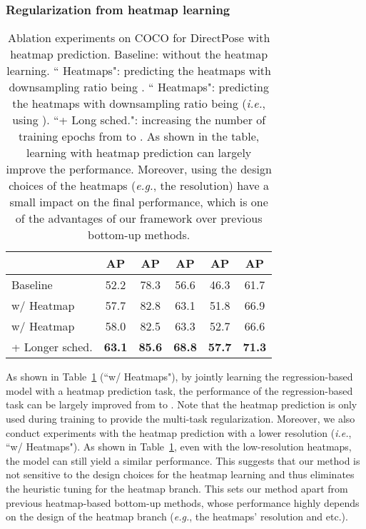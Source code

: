 \documentclass[10pt,twocolumn,letterpaper]{article}
\renewcommand{\texttt}[1]{}
\def\eg{{\it e.g.}\xspace}
\def\ie{{\it i.e.}\xspace}
\newcommand{\1}{{\mathbbm{1}}}
\begin{document}
{\subsubsection{Regularization from heatmap learning}
\begin{table}
	\small
    \begin{center}
	\begin{tabular}{ l | c c c c c}
		\hline
		& AP & AP & AP & AP & AP \\
		\hline\hline
		Baseline & 52.2 & 78.3 & 56.6 & 46.3 & 61.7 \\
		w/  Heatmap & 57.7 & 82.8 & 63.1 & 51.8 & 66.9 \\
		w/ \space\space Heatmap & 58.0 & 82.5 & 63.3 & 52.7 & 66.6 \\
		\hline
		+ Longer sched. & \textbf{63.1} & \textbf{85.6} & \textbf{68.8} & \textbf{57.7} & \textbf{71.3} \\
		\hline
	\end{tabular}
	\end{center}
	\caption{Ablation experiments on COCO \texttt{minival} for DirectPose with heatmap prediction. Baseline: without the heatmap learning. `` Heatmaps": predicting the heatmaps with downsampling ratio being . `` Heatmaps": predicting the heatmaps with downsampling ratio being  (\ie, using ). ``+ Long sched.": increasing the number of training epochs from  to . As shown in the table, learning with heatmap prediction can largely improve the performance. Moreover, using the design choices of the heatmaps (\eg, the resolution) have a small impact on the final performance, which is one of the advantages of our framework over previous bottom-up methods.} \label{table:e2e_pose_w_heatmaps}
\end{table}
As shown in Table~\ref{table:e2e_pose_w_heatmaps} (``w/  Heatmaps"), by jointly learning the regression-based model with a heatmap prediction task, the performance of the regression-based task can be largely improved from  to . Note that the heatmap prediction is only used during training to provide the multi-task regularization. Moreover, we also conduct experiments with the heatmap prediction with a lower resolution (\ie, ``w/  Heatmaps"). As shown in Table~\ref{table:e2e_pose_w_heatmaps}, even with the low-resolution heatmaps, the model can still yield a similar performance. This suggests that our method is not sensitive to the design choices for the heatmap learning and thus eliminates the heuristic tuning for the heatmap branch. This sets our method apart from previous heatmap-based bottom-up methods, whose performance highly depends on the design of the heatmap branch (\eg, the heatmaps' resolution and etc.).

}
\end{document}
